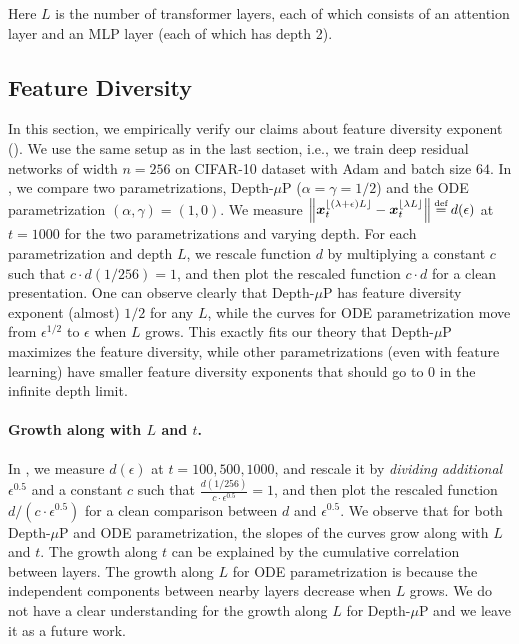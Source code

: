 \documentclass{article}
\theoremstyle{plain}
\theoremstyle{definition}
\begin{document}
Here $L$ is the number of transformer layers, each of which consists of an attention layer and an MLP layer (each of which has depth 2).

\subsection{Feature Diversity}

In this section, we empirically verify our claims about feature diversity exponent (). We use the same setup as in the last section, i.e., we train deep residual networks of width $n=256$ on CIFAR-10 dataset with Adam and batch size $64$. In , we compare two parametrizations, Depth-$\mu$P ($\alpha=\gamma=1/2$) and the ODE parametrization $(\alpha,\gamma)=(1,0)$. We measure $\left\| \xx^{\lfloor (\lambda + \epsilon) L \rfloor}_t - \xx_t^{\lfloor \lambda L \rfloor} \right\|\odefeq d(\epsilon)$ at $t=1000$ for the two parametrizations and varying depth. For each parametrization and depth $L$, we rescale function $d$ by multiplying a constant $c$ such that $c\cdot d(1/256)=1$, and then plot the rescaled function $c\cdot d$ for a clean presentation. One can observe clearly that Depth-$\mu$P has feature diversity exponent (almost) $1/2$ for any $L$, while the curves for ODE parametrization move from $\epsilon^{1/2}$ to $\epsilon$ when $L$ grows.   This exactly fits our theory that Depth-$\mu$P maximizes the feature diversity, while other parametrizations (even with feature learning) have smaller feature diversity exponents that should go to $0$ in the infinite depth limit.

\paragraph{Growth along with $L$ and $t$.} In , we measure $d(\epsilon)$ at $t=100, 500, 1000$, and rescale it by \emph{dividing} \emph{additional} $\epsilon^{0.5}$ and a constant $c$ such that $\frac{d(1/256)}{c\cdot \epsilon^{0.5}}=1$, and then plot the rescaled function $d/(c\cdot \epsilon^{0.5})$ for a clean comparison between $d$ and $\epsilon^{0.5}$. We observe that for both Depth-$\mu$P and ODE parametrization, the slopes of the curves grow along with $L$ and $t$. The growth along $t$ can be explained by the cumulative correlation between layers. The growth along $L$ for ODE parametrization is because the independent components between nearby layers decrease when $L$ grows. We do not have a clear understanding for the growth along $L$ for Depth-$\mu$P and we leave it as a future work.
\end{document}
